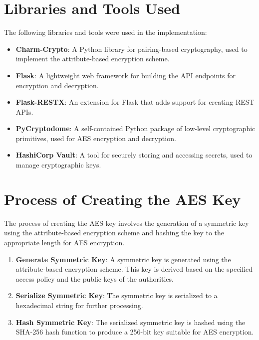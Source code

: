 \section{Libraries and Tools Used}

The following libraries and tools were used in the implementation:

\begin{itemize}
    \item \textbf{Charm-Crypto}: A Python library for pairing-based cryptography, used to implement the attribute-based encryption scheme.
    \item \textbf{Flask}: A lightweight web framework for building the API endpoints for encryption and decryption.
    \item \textbf{Flask-RESTX}: An extension for Flask that adds support for creating REST APIs.
    \item \textbf{PyCryptodome}: A self-contained Python package of low-level cryptographic primitives, used for AES encryption and decryption.
    \item \textbf{HashiCorp Vault}: A tool for securely storing and accessing secrets, used to manage cryptographic keys.
\end{itemize}




\section{Process of Creating the AES Key}

The process of creating the AES key involves the generation of a symmetric key using the attribute-based encryption scheme and hashing the key to the appropriate length for AES encryption.

\begin{enumerate}
    \item \textbf{Generate Symmetric Key}: A symmetric key is generated using the attribute-based encryption scheme. This key is derived based on the specified access policy and the public keys of the authorities.
    \item \textbf{Serialize Symmetric Key}: The symmetric key is serialized to a hexadecimal string for further processing.
    \item \textbf{Hash Symmetric Key}: The serialized symmetric key is hashed using the SHA-256 hash function to produce a 256-bit key suitable for AES encryption.
\end{enumerate}

